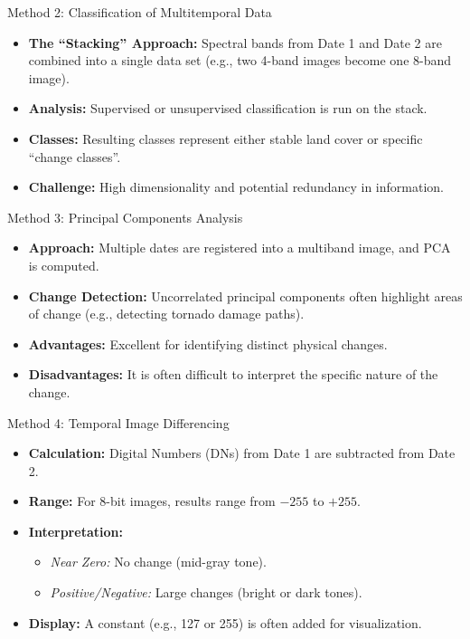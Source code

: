 \documentclass[aspectratio=169]{beamer}
\begin{document}
\begin{frame}{Method 2: Classification of Multitemporal Data}
    \begin{itemize}
        \item \textbf{The ``Stacking'' Approach:} Spectral bands from Date 1 and Date 2 are combined into a single data set (e.g., two 4-band images become one 8-band image).
        \item \textbf{Analysis:} Supervised or unsupervised classification is run on the stack.
        \item \textbf{Classes:} Resulting classes represent either stable land cover or specific ``change classes''.
        \item \textbf{Challenge:} High dimensionality and potential redundancy in information.
    \end{itemize}
\end{frame}

\begin{frame}{Method 3: Principal Components Analysis}
    \begin{itemize}
        \item \textbf{Approach:} Multiple dates are registered into a multiband image, and PCA is computed.
        \item \textbf{Change Detection:} Uncorrelated principal components often highlight areas of change (e.g., detecting tornado damage paths).
        \item \textbf{Advantages:} Excellent for identifying distinct physical changes.
        \item \textbf{Disadvantages:} It is often difficult to interpret the specific nature of the change.
    \end{itemize}
\end{frame}

\begin{frame}{Method 4: Temporal Image Differencing}
    \begin{itemize}
        \item \textbf{Calculation:} Digital Numbers (DNs) from Date 1 are subtracted from Date 2.
        \item \textbf{Range:} For 8-bit images, results range from $-255$ to $+255$.
        \item \textbf{Interpretation:}
        \begin{itemize}
            \item \textit{Near Zero:} No change (mid-gray tone).
            \item \textit{Positive/Negative:} Large changes (bright or dark tones).
        \end{itemize}
        \item \textbf{Display:} A constant (e.g., 127 or 255) is often added for visualization.
    \end{itemize}
\end{frame}
\end{document}

